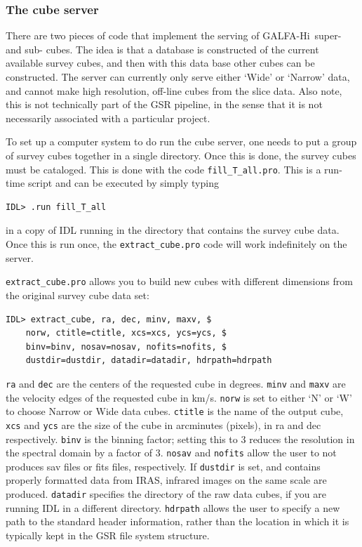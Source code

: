 \documentclass[11pt]{article}
\newcommand{\hi}{H{\sc i}~}
\begin{document}
{\subsubsection{The cube server}

There are two pieces of code that implement the serving of GALFA-\hi super- and sub- cubes. The idea is that a database is constructed of the current available survey cubes, and then with this data base other cubes can be constructed. The server can currently only serve either `Wide' or `Narrow' data, and cannot make high resolution, off-line cubes from the slice data. Also note, this is not technically part of the GSR pipeline, in the sense that it is not necessarily associated with a particular project. 

To set up a computer system to do run the cube server, one needs to put a group of survey cubes together in a single directory. Once this is done, the survey cubes must be cataloged. This is done with the code \texttt{fill\_T\_all.pro}. This is a run-time script and can be executed by simply typing 
\begin{verbatim}
IDL> .run fill_T_all
\end{verbatim}
in a copy of IDL running in the directory that contains the survey cube data. Once this is run once, the \texttt{extract\_cube.pro} code will work indefinitely on the server. 

\texttt{extract\_cube.pro} allows you to build new cubes with different dimensions from the original survey cube data set:
\begin{verbatim}
IDL> extract_cube, ra, dec, minv, maxv, $
	norw, ctitle=ctitle, xcs=xcs, ycs=ycs, $
	binv=binv, nosav=nosav, nofits=nofits, $
	dustdir=dustdir, datadir=datadir, hdrpath=hdrpath
\end{verbatim}

\texttt{ra} and \texttt{dec} are the centers of the requested cube in degrees. \texttt{minv} and \texttt{maxv} are the velocity edges of the requested cube in km/s. \texttt{norw} is set to either `N' or `W' to choose Narrow or Wide data cubes. \texttt{ctitle} is the name of the output cube, \texttt{xcs} and \texttt{ycs} are the size of the cube in arcminutes (pixels), in ra and dec respectively. \texttt{binv} is the binning factor; setting this to 3 reduces the resolution in the spectral domain by a factor of 3. \texttt{nosav} and \texttt{nofits} allow the user to not produces sav files or fits files, respectively. If \texttt{dustdir} is set, and contains properly formatted data from IRAS, infrared images on the same scale are produced. \texttt{datadir} specifies the directory of the raw data cubes, if you are running IDL in a different directory. \texttt{hdrpath} allows the user to specify a new path to the standard header information, rather than the location in which it is typically kept in the GSR file system structure. 

}
\end{document}
